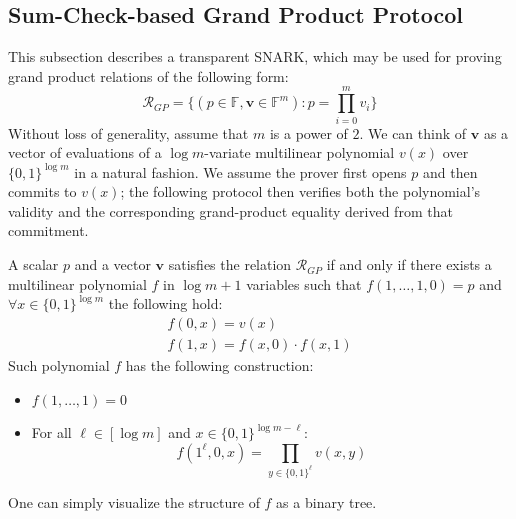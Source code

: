 \documentclass[../../book]{subfiles}
\begin{document}
\subsection{Sum-Check-based Grand Product Protocol}
\label{sec:grand-products}

This subsection describes a transparent SNARK, which may be used for proving grand product relations of the following form:
\begin{equation}
\mathcal{R}_{GP} = \big\{ (p \in \mathbb{F}, \mathbf{v} \in \mathbb{F}^m)\colon p = \prod_{i=0}^m v_i \big\} \label{grand-product-relation}
\end{equation}
Without loss of generality, assume that $m$ is a power of $2$.
We can think of $\mathbf{v}$ as a vector of evaluations of a $\log m$-variate multilinear polynomial $v(x)$ over 
$\{0, 1\}^{\log m}$ in a natural fashion. We assume the prover first opens $p$ and then commits to $v(x)$; the 
following protocol then verifies both the polynomial's validity and the corresponding grand-product equality derived
from that commitment.

\begin{lemma}
A scalar $p$ and a vector $\mathbf{v}$ satisfies the relation $\mathcal{R}_{GP}$ if and only if there exists a 
multilinear polynomial $f$ in $\log m + 1$ variables such that $f(1,\dots,1, 0) = p$ and $\forall x \in \{0,1\}^{\log m}$
 the following hold:
\begin{gather*}
f(0, x) = v(x)\\
f(1,x) = f(x, 0) \cdot f(x, 1)
\end{gather*}
Such polynomial $f$ has the following construction: \begin{itemize}
    \item $f(1,\dots,1) = 0$
    \item For all $\ell \in [\log m]$ and $x \in \{0,1\}^{\log m - \ell}$: \\ 
    \vspace{-0.8em}
    \begin{equation*}
        f(1^\ell, 0, x) = \prod_{y \in \{0,1\}^\ell}v(x,y)
    \end{equation*}
\end{itemize}
\end{lemma}

One can simply visualize the structure of $f$ as a binary tree.
\end{document}
